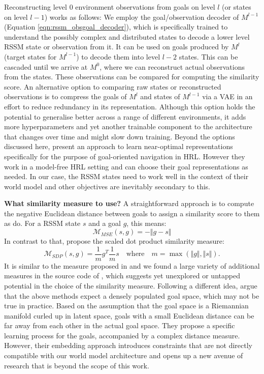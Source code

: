 \documentclass{article}
\begin{document}
Reconstructing level 0 environment observations from goals on level $l$ (or states on level $l-1$) works as follows: We employ the goal/observation decoder of $M^{l-1}$ (Equation \ref{eqn:rssm_obsgoal_decoder}), which is specifically trained to understand the possibly complex and distributed states to decode a lower level RSSM state or observation from it. 
It can be used on goals produced by $M^{l}$ (target states for $M^{l-1}$) to decode them into level $l-2$ states. 
This can be cascaded until we arrive at $M^0$, where we can reconstruct actual observations from the states. 
These observations can be compared for computing the similarity score.
An alternative option to comparing raw states or reconstructed observations is to compress the goals of $M^l$ and states of $M^{l-1}$ via a VAE in an effort to reduce redundancy in its representation. 
Although this option holds the potential to generalise better across a range of different environments, it adds more hyperparameters and yet another trainable component to the architecture that changes over time and might slow down training.
Beyond the options discussed here, \citet{nachum2019near} present an approach to learn near-optimal representations specifically for the purpose of goal-oriented navigation in HRL. However they work in a model-free HRL setting and can choose their goal representations as needed. In our case, the RSSM states need to work well in the context of their world model and other objectives are inevitably secondary to this.

\textbf{What similarity measure to use?} A straightforward approach is to compute the negative Euclidean distance between goals to assign a similarity score to them as \citet{nachum2018data} do. For a RSSM state $s$ and a goal $g$, this means: 
\begin{equation}\label{eqn:goal_similarity_mse}
    \mathcal{M}_{MSE}(s, g) = - \Vert g - s \Vert
\end{equation}
In contrast to that, \citet{hafner2022deep} propose the scaled dot product similarity measure:
\begin{equation}\label{eqn:goal_similarity_ndp}
    \mathcal{M}_{SDP}(s, g) = \frac{1}{m}g^T \frac{1}{m} s \quad \text{where} \quad m = \max(\Vert g \Vert, \Vert s \Vert).
\end{equation}
It is similar to the measure proposed in \citet{vezhnevets2017feudal} and we found a large variety of additional measures in the source code of \citet{hafner2022deep}, which suggests yet unexplored or untapped potential in the choice of the similarity measure. 
Following a different idea, \citet{liu2022searching} argue that the above methods expect a densely populated goal space, which may not be true in practice. Based on the assumption that the goal space is a Riemannian manifold curled up in latent space, goals with a small Euclidean distance can be far away from each other in the actual goal space. They propose a specific learning process for the goals, accompanied by a complex distance measure. However, their embedding approach introduces constraints that are not directly compatible with our world model architecture and opens up a new avenue of research that is beyond the scope of this work.
\end{document}
